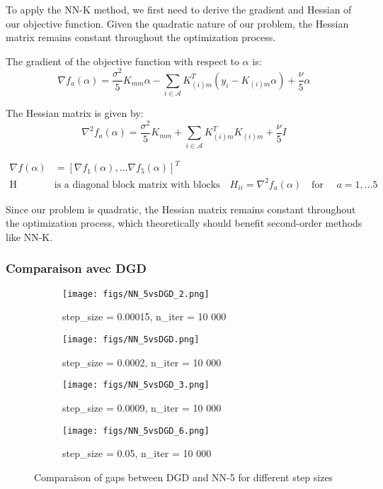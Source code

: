 \documentclass[10pt,english]{article}
\begin{document}
To apply the NN-K method, we first need to derive the gradient and Hessian of our objective function. Given the quadratic nature of our problem, the Hessian matrix remains constant throughout the optimization process.

The gradient of the objective function with respect to $\alpha$ is:
\begin{equation}
\nabla f_a(\alpha) = \frac{\sigma^2}{5}K_{mm}\alpha - \sum_{i \in \mathcal{A}} K_{(i)m}^T(y_i - K_{(i)m}\alpha) + \frac{\nu}{5}\alpha
\end{equation}

The Hessian matrix is given by:
\begin{equation}
\nabla^2 f_a(\alpha) = \frac{\sigma^2}{5}K_{mm} + \sum_{i \in \mathcal{A}} K_{(i)m}^T K_{(i)m} + \frac{\nu}{5}I
\end{equation}

\begin{align*}
    \nabla f(\alpha) &= [\nabla f_1(\alpha), \dots \nabla f_5(\alpha) ]^T \\
    \mathrm{H}\quad &\text{is a diagonal block matrix with blocks} \quad H_{ii} = \nabla^2 f_a(\alpha) \quad \text{for } \quad a=1, \dots 5   
\end{align*}

Since our problem is quadratic, the Hessian matrix remains constant throughout the optimization process, which theoretically should benefit second-order methods like NN-K.

\subsubsection{Comparaison avec DGD}

\begin{figure}[h!]
    \centering 
    \begin{subfigure}[b]{0.4\textwidth}
        \texttt{[image: figs/NN\_5vsDGD\_2.png]}
        \caption{step\_size = 0.00015, n\_iter = 10 000}
    \end{subfigure}
    \begin{subfigure}[b]{0.4\textwidth}
        \texttt{[image: figs/NN\_5vsDGD.png]}
        \caption{step\_size = 0.0002, n\_iter = 10 000}
    \end{subfigure}
    \hfill  %
    \begin{subfigure}[b]{0.4\textwidth}
        \texttt{[image: figs/NN\_5vsDGD\_3.png]}
        \caption{step\_size = 0.0009, n\_iter = 10 000}
    \end{subfigure}
    \begin{subfigure}[b]{0.4\textwidth}
        \texttt{[image: figs/NN\_5vsDGD\_6.png]}
        \caption{step\_size = 0.05, n\_iter = 10 000}
    \end{subfigure}
    \caption{Comparaison of gaps between DGD and NN-5 for different step sizes}
    \label{fig:thyroid_d3}
\end{figure}
\end{document}
